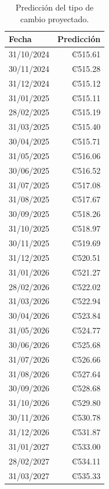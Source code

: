 \documentclass[12pt]{article}
\begin{document}
\newpage
\begin{table}[h!] %
\centering %
\caption{Predicción del tipo de cambio proyectado.}
\label{tab:prediccion_tipo_cambio} %
\begin{multicols}{2} %
\noindent
\begin{tabular}{lr}
  \hline \hline
  Fecha & Predicción \\ 
  \hline
  31/10/2024 & ₡515.61 \\ 
  30/11/2024 & ₡515.28 \\ 
  31/12/2024 & ₡515.12 \\ 
  31/01/2025 & ₡515.11 \\ 
  28/02/2025 & ₡515.19 \\ 
  31/03/2025 & ₡515.40 \\ 
  30/04/2025 & ₡515.71 \\ 
  31/05/2025 & ₡516.06 \\ 
  30/06/2025 & ₡516.52 \\ 
  31/07/2025 & ₡517.08 \\ 
  31/08/2025 & ₡517.67 \\ 
  30/09/2025 & ₡518.26 \\ 
  31/10/2025 & ₡518.97 \\ 
  30/11/2025 & ₡519.69 \\ 
  31/12/2025 & ₡520.51 \\ 
  31/01/2026 & ₡521.27 \\ 
  28/02/2026 & ₡522.02 \\ 
  31/03/2026 & ₡522.94 \\ 
  30/04/2026 & ₡523.84 \\ 
  31/05/2026 & ₡524.77 \\ 
  30/06/2026 & ₡525.68 \\ 
  31/07/2026 & ₡526.66 \\ 
  31/08/2026 & ₡527.64 \\ 
  30/09/2026 & ₡528.68 \\ 
  31/10/2026 & ₡529.80 \\ 
  30/11/2026 & ₡530.78 \\ 
  31/12/2026 & ₡531.87 \\ 
  31/01/2027 & ₡533.00 \\ 
  28/02/2027 & ₡534.11 \\ 
  31/03/2027 & ₡535.33 \\
  \hline \hline
\end{tabular}


\end{multicols}
\end{table}
\end{document}
